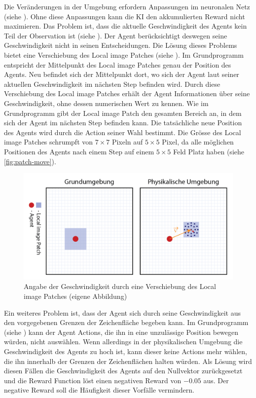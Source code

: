  
Die Veränderungen in der Umgebung erfordern Anpassungen im neuronalen Netz
(siehe ). Ohne diese Anpassungen kann die KI den
akkumulierten Reward nicht maximieren. Das Problem ist, dass die aktuelle
Geschwindigkeit des Agents kein Teil der Observation ist (siehe
). Der Agent berücksichtigt deswegen seine
Geschwindigkeit nicht in seinen Entscheidungen. Die Lösung dieses Problems
bietet eine Verschiebung des Local image Patches (siehe ).
Im Grundprogramm entspricht der Mittelpunkt des Local image Patches genau der
Position des Agents. Neu befindet sich der Mittelpunkt dort, wo sich der Agent
laut seiner aktuellen Geschwindigkeit im nächsten Step befinden wird. Durch
diese Verschiebung des Local image Patches erhält der Agent Informationen über
seine Geschwindigkeit, ohne dessen numerischen Wert zu kennen. Wie im
Grundprogramm gibt der Local image Patch den gesamten Bereich an, in dem sich
der Agent im nächsten Step befinden kann. Die tatsächliche neue Position des
Agents wird durch die Action seiner Wahl bestimmt. Die Grösse des Local image
Patches schrumpft von $7\times7$ Pixeln auf $5\times5$ Pixel, da alle möglichen
Positionen des Agents nach einem Step auf einem $5\times5$ Feld Platz haben
(siehe \autoref{fig:patch-move}).
 
\begin{figure}[!ht]
 \centering
 \includegraphics[width=\textwidth]{images/methode/patch-move.png}
 \caption{Angabe der Geschwindigkeit durch eine Verschiebung des Local image Patches (eigene Abbildung)}\label{fig:patch-move}
\end{figure}
 
 
Ein weiteres Problem ist, dass der Agent sich durch seine Geschwindigkeit aus
den vorgegebenen Grenzen der Zeichenfläche begeben kann. Im Grundprogramm 
(siehe ) kann der Agent Actions, die ihn in eine
unzulässige Position bewegen würden, nicht auswählen. Wenn allerdings in der
physikalischen Umgebung die Geschwindigkeit des Agents zu hoch ist, kann dieser
keine Actions mehr wählen, die ihn innerhalb der Grenzen der Zeichenflächen
halten würden. Als Lösung wird diesen Fällen die Geschwindigkeit des Agents auf den
Nullvektor zurückgesetzt und die Reward Function löst einen negativen Reward von
$-0.05$ aus. Der negative Reward soll die Häufigkeit dieser Vorfälle vermindern.
 
